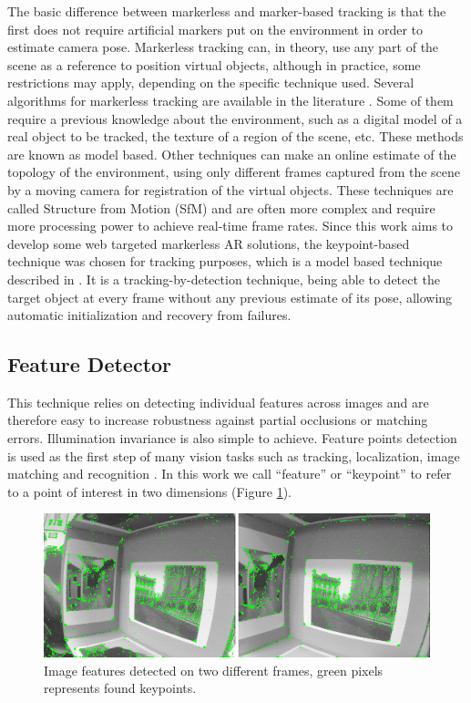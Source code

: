 The basic difference between markerless and marker-based tracking is that the first does not require artificial markers put on the environment in order to estimate camera pose. Markerless tracking can, in theory, use any part of the scene as a reference to position virtual objects, although in practice, some restrictions may apply, depending on the specific technique used. Several algorithms for markerless tracking are available in the literature \cite{Teichrieb2007}. Some of them require a previous knowledge about the environment, such as a digital model of a real object to be tracked, the texture of a region of the scene, etc. These methods are known as model based. Other techniques can make an online estimate of the topology of the environment, using only different frames captured from the scene by a moving camera for registration of the virtual objects. These techniques are called Structure from Motion (SfM) and are often more complex and require more processing power to achieve real-time frame rates. Since this work aims to develop some web targeted markerless AR solutions, the keypoint-based technique was chosen for tracking purposes, which is a model based technique described in \cite{Teichrieb2010}. It is a tracking-by-detection technique, being able to detect the target object at every frame without any previous estimate of its pose, allowing automatic initialization and recovery from failures.


\subsection{Feature Detector} %
\label{sub:tracking_library_for_the_web:marker_less_tracking_algorithm:feature_detector}

This technique relies on detecting individual features across images and are therefore easy to increase robustness against partial occlusions or matching errors. Illumination invariance is also simple to achieve. Feature points detection is used as the first step of many vision tasks such as tracking, localization, image matching and recognition \cite{Lepetit2005}. In this work we call ``feature'' or ``keypoint'' to refer to a point of interest in two dimensions (Figure \ref{figure:keypoints}).

\begin{figure}[!htb]
  \centering
  \includegraphics[width=380pt]{chapters/tracking_library_for_the_web/keypoints.png}
  \caption{Image features detected on two different frames, green pixels represents found keypoints.}
  \label{figure:keypoints}
\end{figure}

